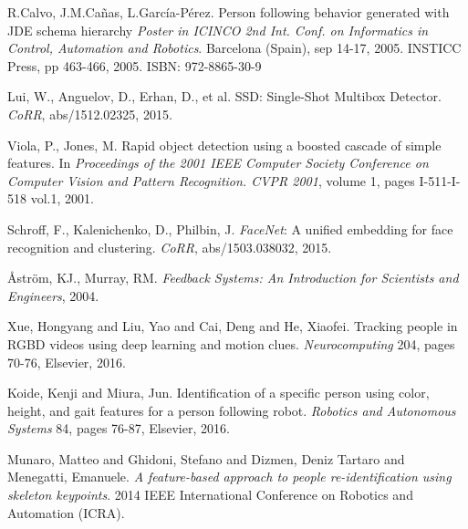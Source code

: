 \documentclass{svproc}
\begin{document}
\begin{thebibliography}{6}
R.Calvo, J.M.Cañas, L.García-Pérez. 
Person following behavior generated with JDE schema hierarchy 
\textit{Poster in ICINCO 2nd Int. Conf. on Informatics in Control, Automation and Robotics}. Barcelona (Spain), sep 14-17, 2005. INSTICC Press, pp 463-466, 2005. ISBN: 972-8865-30-9

Lui, W., Anguelov, D., Erhan, D., et al. 
SSD: Single-Shot Multibox Detector. 
\emph{CoRR}, abs/1512.02325, 2015.

Viola, P., Jones, M. 
Rapid object detection using a boosted cascade of simple features. 
In \emph{Proceedings of the 2001 IEEE Computer Society Conference on Computer Vision and Pattern Recognition. CVPR 2001}, volume 1, pages I-511-I-518 vol.1, 2001.

Schroff, F., Kalenichenko, D., Philbin, J. 
\emph{FaceNet}: A unified embedding for face recognition and clustering. 
\emph{CoRR}, abs/1503.038032, 2015.

Åström, KJ., Murray, RM. 
\textit{Feedback Systems: An Introduction for Scientists and Engineers}, 2004.

Xue, Hongyang and Liu, Yao and Cai, Deng and He, Xiaofei. 
Tracking people in RGBD videos using deep learning and motion clues. 
\textit{Neurocomputing} 204, pages 70-76, Elsevier, 2016. 

Koide, Kenji and Miura, Jun.
Identification of a specific person using color, height, and gait features for a person following robot.
\textit{Robotics and Autonomous Systems} 84, pages 76-87, Elsevier, 2016.

Munaro, Matteo and Ghidoni, Stefano and Dizmen, Deniz Tartaro and Menegatti, Emanuele.
\textit{A feature-based approach to people re-identification using skeleton keypoints}.
2014 IEEE International Conference on Robotics and Automation (ICRA). 



\end{thebibliography}
\end{document}
